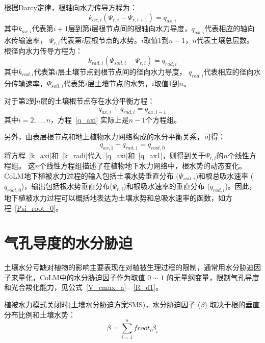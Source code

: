 根据Darcy定律，根轴向水力传导方程为：
\begin{equation}\label{k_axi}
k_{ax,i}\left(\Psi_{r,i}-\Psi_{r,i+1}\right)=q_{ax,i}
\end{equation}
其中$k_{ax,i}$代表第$i+1$层到第i层根节点间的根轴向水力导度，$q_{ax,i}$代表相应的轴向水传输速率，
$\Psi_{r,i}$代表第$i$层根节点的水势。$i$取值1到$n-1$，$n$代表土壤总层数。\\
根径向水力传导方程为：
\begin{equation}\label{k_radi}
k_{rad,i}\left(\Psi_{soil,i}-\Psi_{r,i}\right)=q_{rad,i}
\end{equation}
其中$k_{rad,i}$代表第$i$层土壤节点到根节点间的径向水力导度，
$q_{rad,i}$代表相应的径向水分传输速率，$\Psi_{soil,i}$代表第$i$层土壤节点的水势，$i$取值1到$n$。



对于第2到$n$层的土壤根节点存在水分平衡方程：
\begin{equation}\label{q_axi}
q_{a x, i}+q_{r a d, i}=q_{a x, i-1}
\end{equation}
其中$i=2, \ldots, n$，方程~\eqref{q_axi} 实际上是$n-1$个方程组。


另外，由表层根节点和地上植物水力网络构成的水分平衡关系，可得：
\begin{equation}\label{q_ax1}
q_{ax,1}+q_{rad, 1}=q_{root,0}
\end{equation}
将方程~\eqref{k_axi}和~\eqref{k_radi}代入~\eqref{q_axi}和~\eqref{q_ax1}，则得到关于$ \Psi_{r,i}$的$n$个线性方程组。
这$n$个线性方程组描述了在植物地下水力网络中，根水势的动态变化。CoLM地下植被水力过程的输入包括土壤水势垂直分布 ($\Psi_{soil,i}$)和根总吸水速率 ($q_{root,0}$)，输出包括根水势垂直分布($\Psi_{r,i}$)和根吸水速率的垂直分布 ($q_{rad,i}$)。因此，地下植被水力过程可以概括地表达为土壤水势和总吸水速率的函数，如方程~\eqref{Psi_root_0}。


\section{气孔导度的水分胁迫}\label{气孔导度的水分胁迫}
土壤水分亏缺对植物的影响主要表现在对植被生理过程的限制，通常用水分胁迫因子来量化，CoLM中的水分胁迫因子作为取值 $0\sim 1$ 的无量纲变量，限制气孔导度和光合羧化能力，见公式~\eqref{V_cmax_a}--~\eqref{R_d1}。

植被水力模式关闭时(土壤水分胁迫方案SMS)，水分胁迫因子 ($\beta$) 取决于根的垂直分布比例和土壤水势：
\begin{equation}\label{beta_0}
\beta=\sum_{i=1}^{n} froot_i \beta_{i}
\end{equation}

